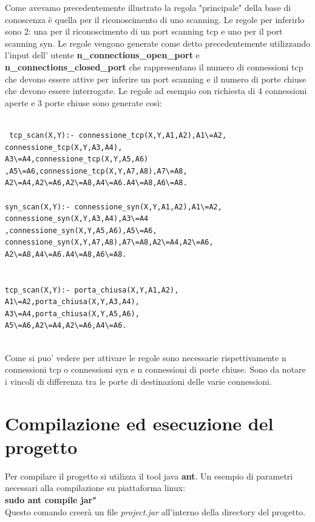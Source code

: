 \documentclass[a4paper,12pt]{article} %
\begin{document}
Come avevamo precedentemente illustrato la regola "principale" della base di conoscenza è quella per il riconoscimento
di uno scanning. Le regole per inferirlo sono 2: una per il riconoscimento di un port scanning tcp e uno per il port scanning
syn. Le regole vengono generate come detto precedentemente utilizzando l'input dell' utente \textbf{n\_connections\_open\_port} e \textbf{n\_connections\_closed\_port} che rappresentano il numero di connessioni tcp che devono essere attive per inferire un port scanning e il numero di porte chiuse che devono essere interrogate.
Le regole ad esempio con richiesta di 4 connessioni aperte e 3 porte chiuse sono generate così:\\


\begin{lstlisting}

 tcp_scan(X,Y):- connessione_tcp(X,Y,A1,A2),A1\=A2,
connessione_tcp(X,Y,A3,A4),
A3\=A4,connessione_tcp(X,Y,A5,A6)
,A5\=A6,connessione_tcp(X,Y,A7,A8),A7\=A8,
A2\=A4,A2\=A6,A2\=A8,A4\=A6.A4\=A8,A6\=A8.

syn_scan(X,Y):- connessione_syn(X,Y,A1,A2),A1\=A2,
connessione_syn(X,Y,A3,A4),A3\=A4
,connessione_syn(X,Y,A5,A6),A5\=A6,
connessione_syn(X,Y,A7,A8),A7\=A8,A2\=A4,A2\=A6,
A2\=A8,A4\=A6.A4\=A8,A6\=A8.
 

tcp_scan(X,Y):- porta_chiusa(X,Y,A1,A2),
A1\=A2,porta_chiusa(X,Y,A3,A4),
A3\=A4,porta_chiusa(X,Y,A5,A6),
A5\=A6,A2\=A4,A2\=A6,A4\=A6.


\end{lstlisting}



Come si puo' vedere per attivare le regole sono necessarie rispettivamente n connessioni tcp o connessioni syn e n
connessioni di porte chiuse. Sono da notare i vincoli di differenza tra le porte di destinazioni delle varie connessioni.




\section{Compilazione ed esecuzione del progetto}

Per compilare il progetto si utilizza il tool java \textbf{ant}. Un esempio 
di parametri necessari alla compilazione su piattaforma linux:\\

\textbf{sudo ant compile jar"}\\

Questo comando creerà un file \emph{project.jar} all'interno della directory del progetto.\\
\end{document}
